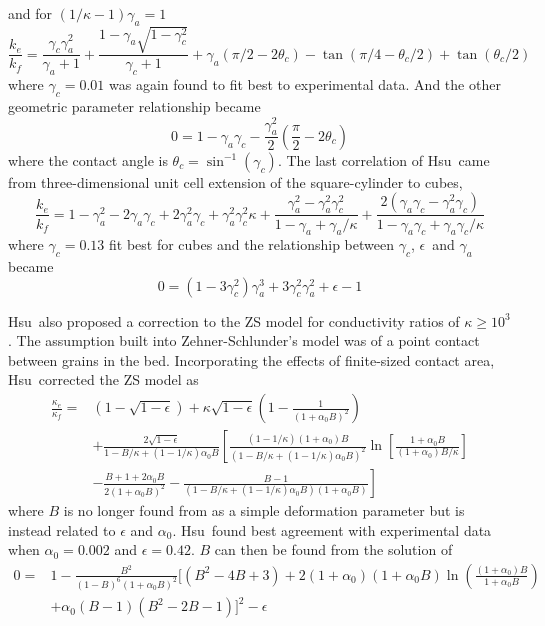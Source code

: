 and for $(1/\kappa-1)\gamma_a=1$
\begin{equation}
    \frac{k_e}{k_f} = \frac{\gamma_c\gamma_a^2}{\gamma_a+1}+\frac{1-\gamma_a\sqrt{1-\gamma_c^2}}{\gamma_c+1}+\gamma_a(\pi/2-2\theta_c)-\tan(\pi/4-\theta_c/2)+\tan(\theta_c/2)
\end{equation}
where $\gamma_c = 0.01$ was again found to fit best to experimental data. And the other geometric parameter relationship became
\begin{equation}
    0 = 1-\gamma_a\gamma_c-\frac{\gamma_a^2}{2}\left(\frac{\pi}{2}-2\theta_c\right)
\end{equation}
where the contact angle is $\theta_c = \sin^{-1}(\gamma_c)$.
The last correlation of Hsu\etal~came from three-dimensional unit cell extension of the square-cylinder to cubes,
\begin{equation}
    \frac{k_e}{k_f} = 1-\gamma_a^2 - 2\gamma_a\gamma_c + 2\gamma_a^2\gamma_c + \gamma_a^2\gamma_c^2\kappa + \frac{\gamma_a^2-\gamma_a^2\gamma_c^2}{1-\gamma_a + \gamma_a/\kappa} + \frac{2(\gamma_a\gamma_c - \gamma_a^2\gamma_c)}{1-\gamma_a\gamma_c+\gamma_a\gamma_c/\kappa}
\end{equation}
where $\gamma_c = 0.13$ fit best for cubes and the relationship between $\gamma_c$, $\epsilon$\ and $\gamma_a$ became
\begin{equation}
    0 = (1-3\gamma_c^2)\gamma_a^3 + 3\gamma_c^2\gamma_a^2 + \epsilon - 1
\end{equation}

Hsu\etal~also proposed a correction to the ZS model for conductivity ratios of $\kappa \ge 10^3$. The assumption built into Zehner-Schlunder's model was of a point contact between grains in the bed. Incorporating the effects of finite-sized contact area, Hsu\etal~corrected the ZS model as
\begin{equation}
\begin{split}
    \frac{\kappa_e}{\kappa_f}={} &(1-\sqrt{1-\epsilon}) + \kappa\sqrt{1-\epsilon}\left(1-\frac{1}{(1+\alpha_0B)^2}\right) \\
    & + \frac{2\sqrt{1-\epsilon}}{1-B/\kappa + (1-1/\kappa)\alpha_0B}\left[\frac{(1-1/\kappa)(1+\alpha_0)B}{(1-B/\kappa + (1-1/\kappa)\alpha_0B)^2}\ln\left[\frac{1+\alpha_0B}{(1+\alpha_0)B/\kappa}\right] \right.\\
    & - \left.\frac{B+1+2\alpha_0B}{2(1+\alpha_0B)^2} - \frac{B-1}{(1-B/\kappa+(1-1/\kappa)\alpha_0B)(1+\alpha_0B)} \right]
\end{split}
\end{equation}
where $B$ is no longer found from as a simple deformation parameter but is instead related to $\epsilon$ and $\alpha_0$. Hsu\etal~found best agreement with experimental data when $\alpha_0 = 0.002$ and $\epsilon=0.42$. $B$ can then be found from the solution of
\begin{equation}
\begin{split}
    0 ={} & 1-\frac{B^2}{(1-B)^6(1+\alpha_0B)^2}\bigg[(B^2-4B+3)+2(1+\alpha_0)(1+\alpha_0B)\ln\left(\frac{(1+\alpha_0)B}{1+\alpha_0B}\right)\\
    &+\alpha_0(B-1)(B^2-2B-1)\bigg]^2 - \epsilon
\end{split}
\end{equation}

